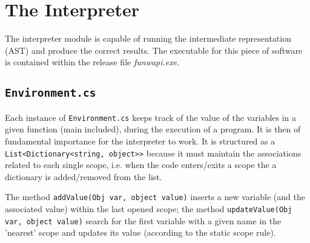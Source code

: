 \chapter{\label{chapter4} The \fwap Interpreter}

The interpreter module is capable of running the \fwap intermediate representation (AST) and produce the correct results. The executable for this piece of software is contained within the release file \textit{funwapi.exe}. 

\section{\texttt{Environment.cs}}

Each instance of \texttt{Environment.cs} keeps track of the value of the variables in a given function (main included), during the execution of a program. It is then of fundamental importance for the interpreter to work. It is structured as a \texttt{List<Dictionary<string, object>>} because it must maintain the associations related to each single scope, i.e. when the code enters/exits a scope the a dictionary is added/removed from the list.

The method \texttt{addValue(Obj var, object value)} inserts a new variable (and the associated value) within the last opened scope; the method \texttt{updateValue(Obj var, object value)} search for the first variable with a given name in the 'nearest' scope and updates its value (according to the static scope rule).

